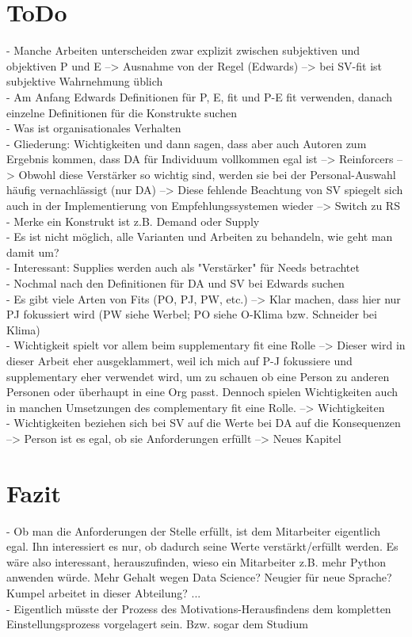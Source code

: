 \section{ToDo}
\label{ch:todo}
- Manche Arbeiten unterscheiden zwar explizit zwischen subjektiven und objektiven P und E --> Ausnahme von der Regel (Edwards) --> bei SV-fit ist subjektive Wahrnehmung üblich \\
- Am Anfang Edwards Definitionen für P, E, fit und P-E fit verwenden, danach einzelne Definitionen für die Konstrukte suchen \\
- Was ist organisationales Verhalten \\
- Gliederung: Wichtigkeiten und dann sagen, dass aber auch Autoren zum Ergebnis kommen, dass DA für Individuum vollkommen egal ist --> Reinforcers --> Obwohl diese Verstärker so wichtig sind, werden sie bei der Personal-Auswahl häufig vernachlässigt (nur DA) --> Diese fehlende Beachtung von SV spiegelt sich auch in der Implementierung von Empfehlungssystemen wieder --> Switch zu RS \\
- Merke ein Konstrukt ist z.B. Demand oder Supply \\
- Es ist nicht möglich, alle Varianten und Arbeiten zu behandeln, wie geht man damit um? \\
- Interessant: Supplies werden auch als "Verstärker" für Needs betrachtet \\
- Nochmal nach den Definitionen für DA und SV bei Edwards suchen \\
- Es gibt viele Arten von Fits (PO, PJ, PW, etc.) --> Klar machen, dass hier nur PJ fokussiert wird (PW siehe Werbel; PO siehe O-Klima bzw. Schneider bei Klima) \\
- Wichtigkeit spielt vor allem beim supplementary fit eine Rolle --> Dieser wird in dieser Arbeit eher ausgeklammert, weil ich mich auf P-J fokussiere und supplementary eher verwendet wird, um zu schauen ob eine Person zu anderen Personen oder überhaupt in eine Org passt. Dennoch spielen Wichtigkeiten auch in manchen Umsetzungen des complementary fit eine Rolle. --> Wichtigkeiten \\
- Wichtigkeiten beziehen sich bei SV auf die Werte bei DA auf die Konsequenzen --> Person ist es egal, ob sie Anforderungen erfüllt --> Neues Kapitel

\section{Fazit}
\label{ch:fazit}
- Ob man die Anforderungen der Stelle erfüllt, ist dem Mitarbeiter eigentlich egal. Ihn interessiert es nur, ob dadurch seine Werte verstärkt/erfüllt werden. Es wäre also interessant, herauszufinden, wieso ein Mitarbeiter z.B. mehr Python anwenden würde. Mehr Gehalt wegen Data Science? Neugier für neue Sprache? Kumpel arbeitet in dieser Abteilung? ... \\
- Eigentlich müsste der Prozess des Motivations-Herausfindens dem kompletten Einstellungsprozess vorgelagert sein. Bzw. sogar dem Studium


